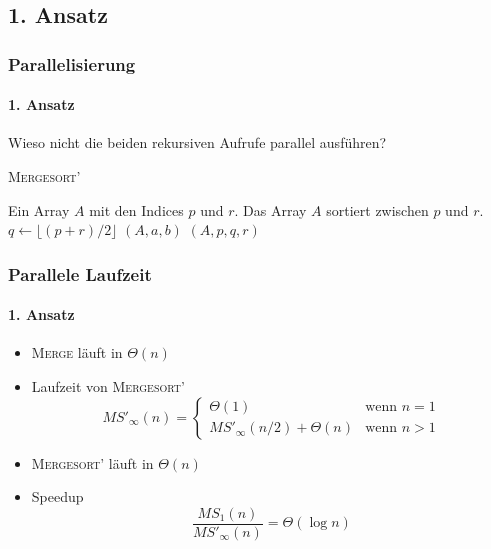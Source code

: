 \subsection{1. Ansatz}
\begin{frame}
    \frametitle{Parallelisierung}
    \framesubtitle{1. Ansatz}
    Wieso nicht die beiden rekursiven Aufrufe parallel ausführen?
    \begin{algorithm}[H]
        \caption{{\rmfamily \textsc{Mergesort'}}}
        \label{alg:mergesort}
        \begin{algorithmic}[1]
            \Require Ein Array $A$ mit den Indices $p$ und $r$.
            \Ensure Das Array $A$ sortiert zwischen $p$ und $r$.
                \State $q \gets \lfloor (p + r) / 2 \rfloor$
                    $(A, a, b)$
                \EndParDo
                $(A, p, q, r)$
            \EndIf
        \end{algorithmic}
    \end{algorithm}
\end{frame}

\begin{frame}
    \frametitle{Parallele Laufzeit}
    \framesubtitle{1. Ansatz}
    \begin{itemize}
        \item {\rmfamily \textsc{Merge}} läuft in $\Theta(n)$
        \item Laufzeit von {\rmfamily \textsc{Mergesort'}}
            \begin{equation}
                MS'_\infty(n) = \begin{cases}
                    \Theta(1) & \text{wenn } n = 1 \\
                    MS'_\infty(n/2) + \Theta(n) & \text{wenn } n > 1
                \end{cases}
            \end{equation}
        \item {\rmfamily \textsc{Mergesort'}} läuft in $\Theta(n)$
        \item Speedup
            \begin{equation}
                \frac{MS_1(n)}{MS'_\infty(n)} = \Theta(\log n)
            \end{equation}
    \end{itemize}
\end{frame}

